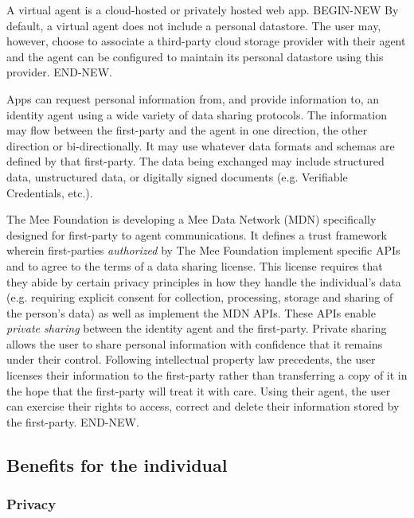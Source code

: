 \documentclass[11pt, oneside]{article}   	%
\begin{document}
A virtual agent is a cloud-hosted or privately hosted web app. BEGIN-NEW By default, a virtual agent does not include a personal datastore. The user may, however, choose to associate a third-party cloud storage provider with their agent and the agent can be configured to maintain its personal datastore using this provider. END-NEW.

Apps can request personal information from, and provide information to, an identity agent using a wide variety of data sharing protocols. The information may flow between the first-party and the agent in one direction, the other direction or bi-directionally. It may use whatever data formats and schemas are defined by that first-party. The data being exchanged may include structured data, unstructured data, or digitally signed documents (e.g. Verifiable Credentials, etc.). 

The Mee Foundation is developing a Mee Data Network (MDN) specifically designed for first-party to agent communications. It defines a trust framework wherein first-parties \emph{authorized} by The Mee Foundation implement specific APIs and to agree to the terms of a data sharing license. This license requires that they abide by certain privacy principles in how they handle the individual's data (e.g. requiring explicit consent for collection, processing, storage and sharing of the person's data) as well as implement the MDN APIs. These APIs enable \emph{private sharing} between the identity agent and the first-party. Private sharing allows the user to share personal information with confidence that it remains under their control. Following intellectual property law precedents, the user licenses their information to the first-party rather than transferring a copy of it in the hope that the first-party will treat it with care. Using their agent, the user can exercise their rights to access, correct and delete their information stored by the first-party. END-NEW.

\subsection{Benefits for the individual}

\subsubsection{Privacy}
\end{document}
